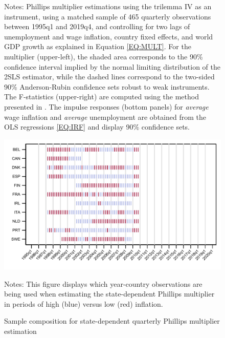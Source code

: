 \documentclass[12pt]{article}
\newcommand{\annote}[1]{\parbox{\textwidth}{\renewcommand{\baselinestretch}{1.0}\vspace{12pt} \footnotesize Notes: #1}}
\begin{document}
\begin{appendices}
\begin{singlespace}
\begin{figure}[h!]
\begin{subfigure}[b]{0.9\textwidth}
		\end{subfigure}
		\annote{Phillips multiplier estimations using the trilemma IV as an instrument, using a matched sample of 465 quarterly observations between 1995q1 and 2019q4, and controlling for two lags of unemployment and wage inflation, country fixed effects, and world GDP growth as explained in Equation \eqref{EQ:MULT}. For the multiplier (upper-left), the shaded area corresponds to the 90\% confidence interval implied by the normal limiting distribution of the 2SLS estimator, while the dashed lines correspond to the two-sided 90\% Anderson-Rubin confidence sets robust to weak instruments. The F-statistics (upper-right) are computed using the method presented in \cite{Olea2013}. The impulse responses (bottom panels) for \textit{average} wage inflation and \textit{average} unemployment are obtained from the OLS regressions \eqref{EQ:IRF} and display 90\% confidence sets.}
	
\end{figure}


\begin{figure}[h!]
    \centering
    \caption{Sample composition for state-dependent quarterly Phillips multiplier estimation}
    \includegraphics[scale=0.55]{../Output/Figures/Figure_A10}
    \annote{\footnotesize This figure displays which year-country observations are being used when estimating the state-dependent Phillips multiplier in periods of high (blue) versus low (red) inflation.}
    \label{F:SampleQ_SD}
\end{figure}


\end{singlespace}
\end{appendices}
\end{document}

